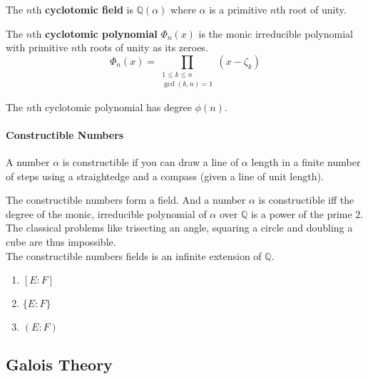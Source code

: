 \begin{definition}
	The $n$th \textbf{cyclotomic field} is $\mathbb{Q}(\alpha)$ where $\alpha$ is a primitive $n$th root of unity.
\end{definition}

\begin{definition}
	The $n$th \textbf{cyclotomic polynomial} $\Phi_n(x)$ is the monic irreducible polynomial with primitive $n$th roots of unity as its zeroes.
	$$ \Phi_n(x) = \prod_{\substack{1 \le k \le n \\ \gcd(k,n)=1}} \!\!\!\!\!\left(x-\zeta_k\right)$$
\end{definition}

	The $n$th cyclotomic polynomial has degree $\phi(n)$.

\paragraph{Constructible Numbers}
	\begin{definition}
		A number $\alpha$ is constructible if you can draw a line of $\alpha$ length in a finite number of steps using a straightedge and a compass (given a line of unit length).
	\end{definition}

	The constructible numbers form a field. And a number $\alpha$ is constructible iff the degree of the monic, irreducible polynomial of $\alpha$ over $\mathbb{Q}$ is a power of the prime $2$. The classical problems like trisecting an angle, squaring a circle and doubling a cube are thus impossible.\\

	The constructible numbers fields is an infinite extension of $\mathbb{Q}$.

\begin{enumerate}
	\item $[E:F]$
	\item $\{E:F\}$
	\item $(E:F)$
\end{enumerate}

\subsection{Galois Theory}
